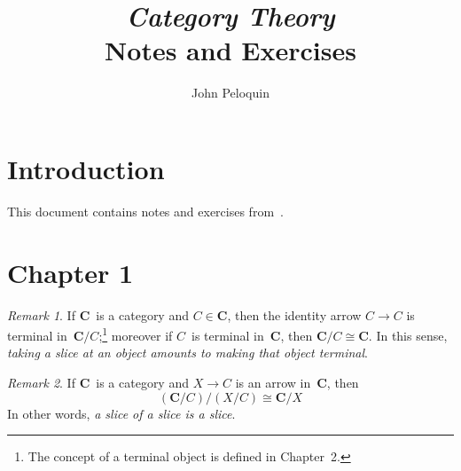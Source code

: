 \documentclass[letterpaper,12pt]{article}
\title{\textit{Category Theory}\\Notes and Exercises}
\author{John Peloquin}
\date{}
\newcommand{\iso}{\cong}
\newcommand{\cat}[1]{\mathbf{#1}}
\newcommand{\C}{\cat{C}}
\theoremstyle{definition}
\theoremstyle{remark}
\newtheorem*{rmk}{Remark}
\theoremstyle{direction}
\begin{document}
\maketitle

\section*{Introduction}
This document contains notes and exercises from~\cite{awodey}.

\section*{Chapter 1}
\begin{rmk}
If \(\C\)~is a category and \(C\in\C\), then the identity arrow \(C\to C\) is terminal in~\(\C/C\);\footnote{The concept of a terminal object is defined in Chapter~2.} moreover if \(C\)~is terminal in~\(\C\), then \(\C/C\iso\C\). In this sense, \emph{taking a slice at an object amounts to making that object terminal}.
\end{rmk}

\begin{rmk}
If \(\C\)~is a category and \(X\to C\) is an arrow in~\(\C\), then
\[(\C/C)/(X/C)\iso\C/X\]
In other words, \emph{a slice of a slice is a slice}.
\end{rmk}
\end{document}

